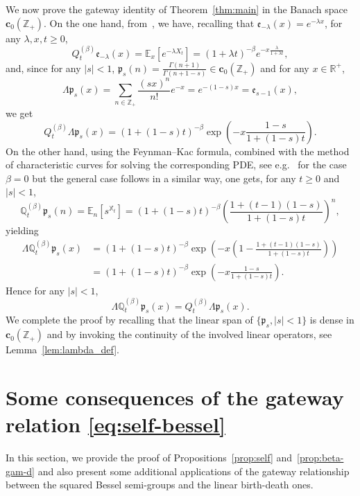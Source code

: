 \documentclass[AHL,Unicode,longabstracts]{cedram}
\newcommand{\ZZ}{\mathbb{Z}}
\newcommand{\fe}{\mathfrak{e}}
\newcommand{\esc}{\mathbf{c}}
\newcommand*\E{{\mathbb E}}
\newcommand*\R{{\mathbb R}}
\newcommand{\discret}[1]{\mathds{#1}}
\newcommand{\cont}[1]{{#1}}
\begin{document}
We now prove the gateway identity of Theorem~\ref{thm:main} in the Banach space $\esc_0(\ZZ_+)$. On the one hand, from~\cite[Chapter~XI]{MR1725357}, we have, recalling that $\fe_{-\lambda}(x)=e^{-\lambda x}$, for any $\lambda,x, t\geq 0$,
\begin{equation*}\label{eq:lt_bessel}
\cont{Q}^{(\beta)}_t \fe_{-\lambda}(x)=\E_x\left[e^{-\lambda \cont{X}_t}\right]= (1+\lambda t)^{-\beta}e^{-x\frac{\lambda}{1+\lambda t}},
\end{equation*}
and, since for any $|s|<1$, $\mathfrak{p}_s(n)=\frac{\Gamma(n+1)}{\Gamma(n+1-s)}\in \esc_0(\ZZ_+)$ and for any $x\in \R^+$,
\[
\Lambda \mathfrak{p}_s(x) =\sum_{n\in\ZZ_+}\frac{(sx)^n}{n!}e^{-x}=e^{-(1-s)x}=\fe_{s-1}(x),
\]
we get
\begin{equation*}
\cont{Q}^{(\beta)}_t \Lambda\mathfrak{p}_s(x)=\left(1+(1-s)t\right)^{-\beta}
\exp\left(-x\frac{1-s}{1+(1-s)t}\right).
\end{equation*}
On the other hand, using the Feynman--Kac formula, combined with the method of characteristic curves for solving the corresponding PDE, see e.g.~\cite[Chapter~4]{Dawson} for the case $\beta=0$ but the general case follows in a similar way, one gets, for any $t\geq 0$ and $|s|<1$,
\begin{equation*}
\discret{Q}^{(\beta)}_t \mathfrak{p}_s(n)=\E_n\left[s^{\discret{X}_t}\right]=\left(1+(1-s)t\right)^{-\beta}
\left(\frac{1+(t-1)(1-s)}{1+(1-s)t}\right)^{n},
\end{equation*}
yielding
\begin{align*}
\Lambda \discret{Q}^{(\beta)}_t \mathfrak{p}_s(x)&=\left(1+(1-s)t\right)^{-\beta}
\exp\left(-x\left(1-\frac{1+(t-1)(1-s)}{1+(1-s)t}\right)\right) \\
&=\left(1+(1-s)t\right)^{-\beta}
\exp\left(-x\frac{1-s}{1+(1-s)t}\right).
\end{align*}
Hence for any $|s|<1$,
\[
\Lambda \discret{Q}^{(\beta)}_t \mathfrak{p}_s(x)=\cont{Q}^{(\beta)}_t \Lambda\mathfrak{p}_s(x).
\]
We complete the proof by recalling that the linear span of $\{\mathfrak{p}_s,|s|<1\}$ is dense in $\esc_0(\ZZ_+)$ and by invoking the continuity of the involved linear operators, see Lemma~\ref{lem:lambda_def}.



\section{Some consequences of the gateway relation \texorpdfstring{\eqref{eq:self-bessel}}{}}\label{sec:cons-bes}
In this section, we provide the proof of Propositions~\ref{prop:self} and~\ref{prop:beta-gam-d} and also present some additional applications of the gateway relationship between the squared Bessel semi-groups and the linear birth-death ones.
\end{document}
